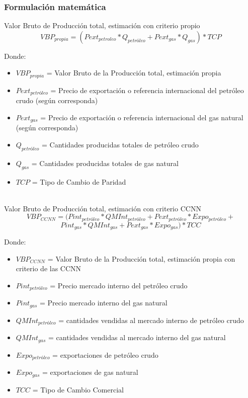 \documentclass[letterpaper,11pt, spanish]{scrartcl}
\begin{document}
\begin{itemize}
\subsubsection{Formulación matemática}

Valor Bruto de Producción total, estimación con criterio propio
$$VBP_{propia} = (Pext_{petroleo} * Q_{petróleo} + Pext_{gas} * Q_{gas}) * TCP$$

Donde: 
\begin{itemize}
\item $VBP_{propia}$ = Valor Bruto de la Producción total, estimación propia
\item $Pext_{petróleo}$ = Precio de exportación o referencia internacional del petróleo crudo (según corresponda)
\item $Pext_{gas}$ = Precio de exportación o referencia internacional del gas natural (según corresponda)
\item $Q_{petróleo}$ = Cantidades producidas totales de petróleo crudo
\item $Q_{gas}$ = Cantidades producidas totales de gas natural
\item $TCP$ = Tipo de Cambio de Paridad \\ \\
\end{itemize}


Valor Bruto de Producción total, estimación con criterio CCNN
$$VBP_{CCNN} = (Pint_{petróleo} * QMInt_{petróleo} + Pext_{petróleo} * Expo_{petróleo} +$$
$$Pint_{gas} * QMInt_{gas} + Pext_{gas} * Expo_{gas})* TCC$$

Donde:
\begin{itemize}

\item $VBP_{CCNN}$ = Valor Bruto de la Producción total,  estimación propia con criterio de las CCNN
\item $Pint_{petróleo}$ = Precio mercado interno del petróleo crudo
\item $Pint_{gas}$ = Precio mercado interno del gas natural
\item $QMInt_{petróleo}$ = cantidades vendidas al mercado interno de petróleo crudo
\item $QMInt_{gas}$ = cantidades vendidas al mercado interno del gas natural
\item $Expo_{petróleo}$ = exportaciones de petróleo crudo
\item $Expo_{gas}$ = exportaciones de gas natural
\item $TCC$ = Tipo de Cambio Comercial\\ \\


\end{itemize}
\end{itemize}
\end{document}
